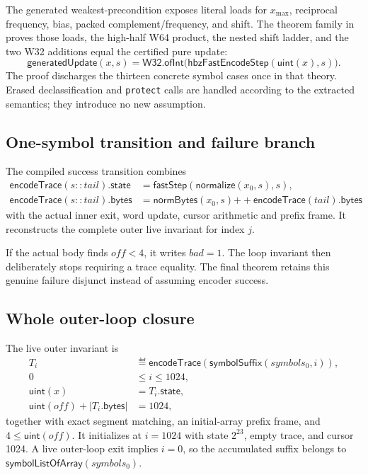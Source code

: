 The generated weakest-precondition exposes literal loads for \(x_{\max}\),
reciprocal frequency, bias, packed complement/frequency, and shift.  The
theorem family in
 proves those loads, the
high-half W64 product, the nested shift ladder, and the two W32 additions equal
the certified pure update:
\[
  \mathsf{generatedUpdate}(x,s)
  =\mathsf{W32.ofInt}\bigl(\mathsf{hbzFastEncodeStep}(\mathsf{uint}(x),s)\bigr).
\]
The proof discharges the thirteen concrete symbol cases once in that theory.
Erased declassification and \texttt{protect} calls are handled according to
the extracted semantics; they introduce no new assumption.

\subsection*{One-symbol transition and failure branch}

The compiled success transition combines
\begin{align*}
  \mathsf{encodeTrace}(s::tail).\mathsf{state}
    &=\mathsf{fastStep}(\mathsf{normalize}(x_0,s),s),\\
  \mathsf{encodeTrace}(s::tail).\mathsf{bytes}
    &=\mathsf{normBytes}(x_0,s)
      \mathbin{++}\mathsf{encodeTrace}(tail).\mathsf{bytes}
\end{align*}
with the actual inner exit, word update, cursor arithmetic and prefix frame.
It reconstructs the complete outer live invariant for index $j$.

If the actual body finds $off<4$, it writes $bad=1$.  The loop invariant
then deliberately stops requiring a trace equality.  The final theorem retains
this genuine failure disjunct instead of assuming encoder success.

\subsection*{Whole outer-loop closure}

The live outer invariant is
\begin{align*}
  T_i &\eqdef \mathsf{encodeTrace}(\mathsf{symbolSuffix}(symbols_0,i)),\\
  0 &\le i\le1024,\\
  \mathsf{uint}(x)&=T_i.\mathsf{state},\\
  \mathsf{uint}(off)+|T_i.\mathsf{bytes}|&=1024,
\end{align*}
together with exact segment matching, an initial-array prefix frame, and
\(4\le\mathsf{uint}(off)\).  It initializes at $i=1024$ with state
$2^{23}$, empty trace, and cursor 1024.  A live outer-loop exit implies
$i=0$, so the accumulated suffix belongs to
\(
  \mathsf{symbolListOfArray}(symbols_0)
\).

